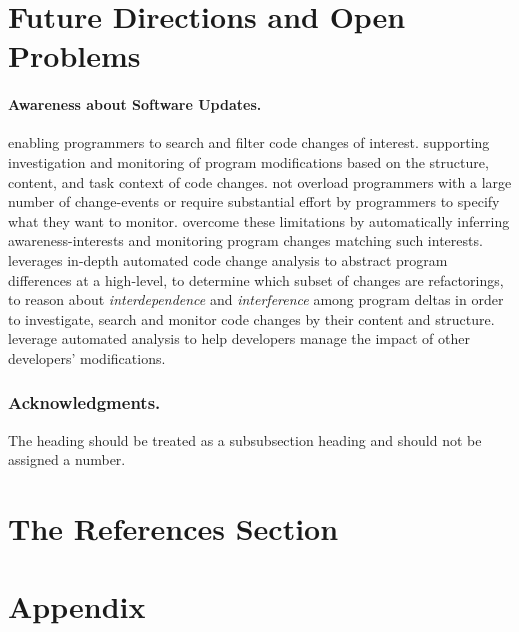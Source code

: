\documentclass[runningheads,a4paper]{llncs}
\begin{document}
\section{Future Directions and Open Problems} 

\paragraph{Awareness about Software Updates.} 
enabling programmers to search and filter code changes of interest. 
supporting investigation and monitoring of program modifications based on the structure, content, and task context of code changes.
not overload programmers with a large number of change-events or require substantial effort by programmers to specify what they want to monitor. 
overcome these limitations by automatically inferring awareness-interests and monitoring program changes matching such interests. 
leverages in-depth automated code change analysis to abstract program differences at a high-level, to determine which subset of changes are refactorings, to reason about {\em interdependence} and {\em interference} among program deltas in order to investigate, search and monitor code changes by their content and structure.  
leverage automated analysis to help developers manage the impact of other developers' modifications. 

\subsubsection*{Acknowledgments.} The heading should be treated as a
subsubsection heading and should not be assigned a number.

\section{The References Section}\label{references}



\section*{Appendix} 
\end{document}
